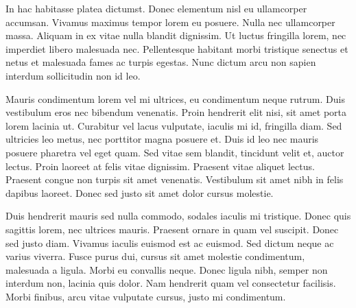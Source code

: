 In hac habitasse platea dictumst. Donec elementum nisl eu ullamcorper accumsan. Vivamus maximus tempor lorem eu posuere. Nulla nec ullamcorper massa. Aliquam in ex vitae nulla blandit dignissim. Ut luctus fringilla lorem, nec imperdiet libero malesuada nec. Pellentesque habitant morbi tristique senectus et netus et malesuada fames ac turpis egestas. Nunc dictum arcu non sapien interdum sollicitudin non id leo.

Mauris condimentum lorem vel mi ultrices, eu condimentum neque rutrum. Duis vestibulum eros nec bibendum venenatis. Proin hendrerit elit nisi, sit amet porta lorem lacinia ut. Curabitur vel lacus vulputate, iaculis mi id, fringilla diam. Sed ultricies leo metus, nec porttitor magna posuere et. Duis id leo nec mauris posuere pharetra vel eget quam. Sed vitae sem blandit, tincidunt velit et, auctor lectus. Proin laoreet at felis vitae dignissim. Praesent vitae aliquet lectus. Praesent congue non turpis sit amet venenatis. Vestibulum sit amet nibh in felis dapibus laoreet. Donec sed justo sit amet dolor cursus molestie.

Duis hendrerit mauris sed nulla commodo, sodales iaculis mi tristique. Donec quis sagittis lorem, nec ultrices mauris. Praesent ornare in quam vel suscipit. Donec sed justo diam. Vivamus iaculis euismod est ac euismod. Sed dictum neque ac varius viverra. Fusce purus dui, cursus sit amet molestie condimentum, malesuada a ligula. Morbi eu convallis neque. Donec ligula nibh, semper non interdum non, lacinia quis dolor. Nam hendrerit quam vel consectetur facilisis. Morbi finibus, arcu vitae vulputate cursus, justo mi condimentum. 
